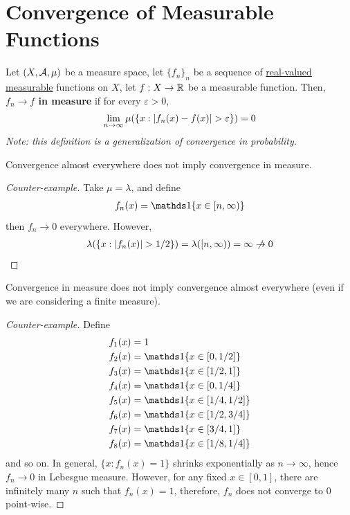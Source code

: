 \documentclass[11pt]{article}
\begin{document}
	\newpage
	\section{Convergence of Measurable Functions}
	\begin{definition}
		Let $(X, \mathcal{{A}}, \mu)$ be a measure space, let $\{f_n\}_n$ be a sequence of \ul{real-valued measurable} functions on $X$, let $f: X \to \mathbb{R}$ be a measurable function.
		Then, \textbf{$f_n \to f$ in measure} if for every $\varepsilon > 0$,
		\begin{align}
			\lim_{n\to\infty} \mu(\{x: \left \vert {f_n(x) - f(x)} \right \vert > \varepsilon \}) = 0
		\end{align}
		\emph{Note: this definition is a generalization of convergence in probability.}
	\end{definition}

	\begin{remark}
		Convergence almost everywhere does not imply convergence in measure.
		\begin{proof}[Counter-example]
			Take $\mu = \lambda$, and define
			\begin{align}
				f_n(x) = \id{x \in [n, \infty)}
			\end{align}
			then $f_n \to 0$ everywhere.
			However,
			\begin{align}
				\lambda(\{x : \abs{f_n(x)} > 1/2\}) = \lambda([n, \infty)) = \infty \centernot{\to} 0	
			\end{align}
		\end{proof}
	\end{remark}

	\begin{remark}
		Convergence in measure does not imply convergence almost everywhere (even if we are considering a finite measure).
		\begin{proof}[Counter-example]
			Define
			\begin{align}
				f_1(x) &= 1 \\
				f_2(x) &= \id{x \in [0, 1/2]} \\
				f_3(x) &= \id{x \in [1/2, 1]} \\
				f_4(x) &= \id{x \in [0, 1/4]} \\
				f_5(x) &= \id{x \in [1/4, 1/2]} \\
				f_6(x) &= \id{x \in [1/2, 3/4]} \\
				f_7(x) &= \id{x \in [3/4, 1]} \\
				f_8(x) &= \id{x \in [1/8, 1/4]}
			\end{align}
			and so on.
			In general, $\{x : f_n(x) = 1\}$ shrinks exponentially as $n \to \infty$, hence $f_n \to 0$ in Lebesgue measure. However, for any fixed $x \in [0, 1]$, there are infinitely many $n$ such that $f_n(x) = 1$, therefore, $f_n$ does not converge to $0$ point-wise.
		\end{proof}
	\end{remark}
\end{document}
